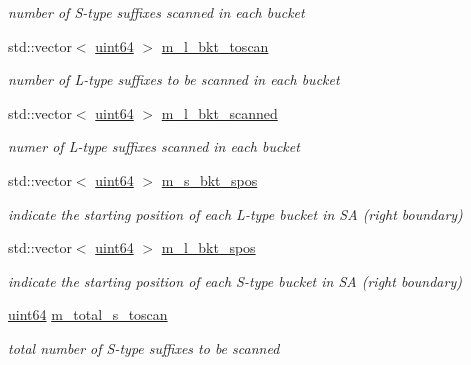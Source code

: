 \begin{DoxyCompactItemize}
\begin{DoxyCompactList}\small\item\em number of S-\/type suffixes scanned in each bucket \end{DoxyCompactList}\item 
std\+::vector$<$ \hyperlink{types_8h_a60e8696a4678cd348e991a1f172e53f7}{uint64} $>$ \hyperlink{struct_validate4_1_1_l_scan_ad500f8ccaffab088a465a288f92fd4b2}{m\+\_\+l\+\_\+bkt\+\_\+toscan}
\begin{DoxyCompactList}\small\item\em number of L-\/type suffixes to be scanned in each bucket \end{DoxyCompactList}\item 
std\+::vector$<$ \hyperlink{types_8h_a60e8696a4678cd348e991a1f172e53f7}{uint64} $>$ \hyperlink{struct_validate4_1_1_l_scan_a41c937ae175b97c22325458bcafeeb7e}{m\+\_\+l\+\_\+bkt\+\_\+scanned}
\begin{DoxyCompactList}\small\item\em numer of L-\/type suffixes scanned in each bucket \end{DoxyCompactList}\item 
std\+::vector$<$ \hyperlink{types_8h_a60e8696a4678cd348e991a1f172e53f7}{uint64} $>$ \hyperlink{struct_validate4_1_1_l_scan_a3a342dcdec25a509df8f943c1e91b3b8}{m\+\_\+s\+\_\+bkt\+\_\+spos}
\begin{DoxyCompactList}\small\item\em indicate the starting position of each L-\/type bucket in SA (right boundary) \end{DoxyCompactList}\item 
std\+::vector$<$ \hyperlink{types_8h_a60e8696a4678cd348e991a1f172e53f7}{uint64} $>$ \hyperlink{struct_validate4_1_1_l_scan_a82878f6289ad8c9ec7204de1e5a2e04c}{m\+\_\+l\+\_\+bkt\+\_\+spos}
\begin{DoxyCompactList}\small\item\em indicate the starting position of each S-\/type bucket in SA (right boundary) \end{DoxyCompactList}\item 
\hyperlink{types_8h_a60e8696a4678cd348e991a1f172e53f7}{uint64} \hyperlink{struct_validate4_1_1_l_scan_abaf348442b39a1a0447a382e1f66f13b}{m\+\_\+total\+\_\+s\+\_\+toscan}
\begin{DoxyCompactList}\small\item\em total number of S-\/type suffixes to be scanned \end{DoxyCompactList}\item 

\end{DoxyCompactItemize}
